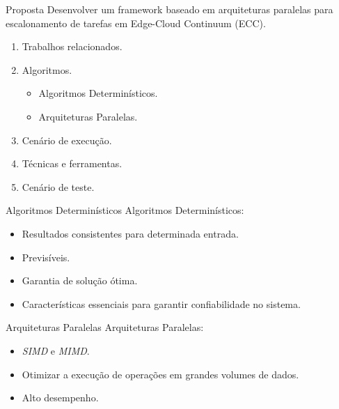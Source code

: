 \begin{frame}{Proposta}
    Desenvolver um framework baseado em arquiteturas paralelas para escalonamento de tarefas em Edge-Cloud Continuum (ECC).
    \vspace{1em}
    \begin{enumerate}
        \item Trabalhos relacionados.
        \item Algoritmos.
        \begin{itemize}
            \item Algoritmos Determinísticos.
            \item Arquiteturas Paralelas.
        \end{itemize}
        \item Cenário de execução.
        \item Técnicas e ferramentas.
        \item Cenário de teste.
    \end{enumerate}
\end{frame}

\begin{frame}{Algoritmos Determinísticos}
    Algoritmos Determinísticos:

    \begin{itemize}
        \item Resultados consistentes para determinada entrada.
        \item Previsíveis.
        \item Garantia de solução ótima.
        \item Características essenciais para garantir confiabilidade no sistema.
    \end{itemize}
\end{frame}

\begin{frame}{Arquiteturas Paralelas}
    Arquiteturas Paralelas:

    \begin{itemize}
        \item \textit{SIMD} e \textit{MIMD}.
        \item Otimizar a execução de operações em grandes volumes de dados.
        \item Alto desempenho.
    \end{itemize}
\end{frame}

